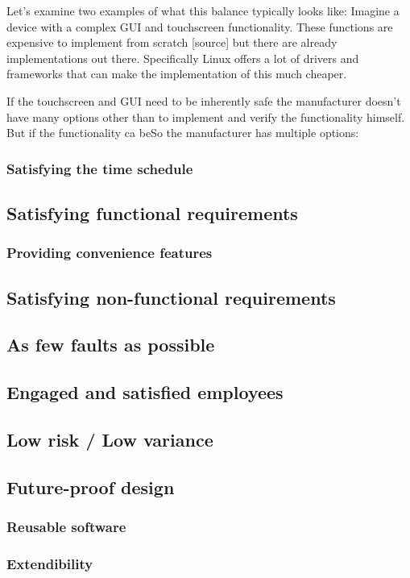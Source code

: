 Let’s examine two examples of what this balance typically looks like: Imagine a device with a complex GUI and touchscreen functionality. These functions are expensive to implement from scratch [source] but there are already implementations out there. Specifically Linux offers a lot of drivers and frameworks that can make the implementation of this much cheaper. 

If the touchscreen and GUI need to be inherently safe the manufacturer doesn’t have many options other than to implement and verify the functionality himself. But if the functionality ca beSo the manufacturer has multiple options:   

\subsubsection{Satisfying the time schedule}
\subsection{Satisfying functional requirements}
\subsubsection{Providing convenience features}
\subsection{Satisfying non-functional requirements}
\subsection{As few faults as possible}
\subsection{Engaged and satisfied employees}
\subsection{Low risk / Low variance}
\subsection{Future-proof design}
\subsubsection{Reusable software}
\subsubsection{Extendibility}
